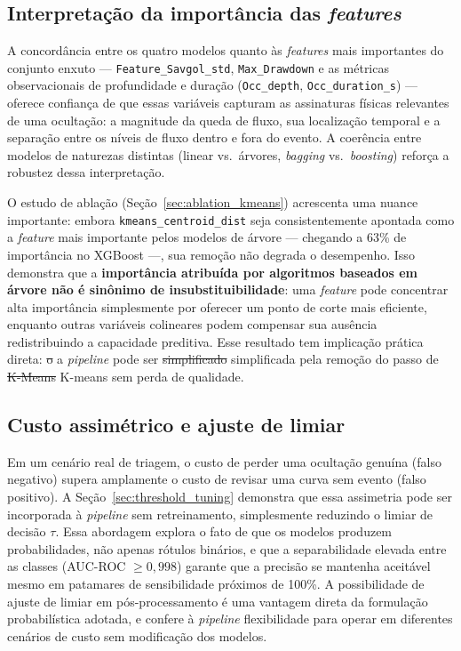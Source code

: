 \documentclass[msc]{on} %
\makeatletter
\providecommand{\DIFaddtex}[1]{{\protect\color{red}#1}} %
\providecommand{\DIFdeltex}[1]{{\protect\color{red}\sout{#1}}} %
\providecommand{\DIFaddbegin}{} %
\providecommand{\DIFaddend}{} %
\providecommand{\DIFdelbegin}{} %
\providecommand{\DIFdelend}{} %
\providecommand{\DIFadd}[1]{\texorpdfstring{\DIFaddtex{#1}}{#1}} %
\providecommand{\DIFdel}[1]{\texorpdfstring{\DIFdeltex{#1}}{}} %
\let\sout@orig\sout %
\renewcommand{\sout}[1]{\ifmmode\text{\sout@orig{\ensuremath{#1}}}\else\sout@orig{#1}\fi} %
\makeatother
\begin{document}
\subsection{Interpretação da importância das \textit{features}}

A concordância entre os quatro modelos quanto às \textit{features} mais importantes do conjunto enxuto --- \texttt{Feature\_Savgol\_std}, \texttt{Max\_Drawdown} e as métricas observacionais de profundidade e duração (\texttt{Occ\_depth}, \texttt{Occ\_duration\_s}) --- oferece confiança de que essas variáveis capturam as assinaturas físicas relevantes de uma ocultação: a magnitude da queda de fluxo, sua localização temporal e a separação entre os níveis de fluxo dentro e fora do evento. A coerência entre modelos de naturezas distintas (linear vs.\ árvores, \textit{bagging} vs.\ \textit{boosting}) reforça a robustez dessa interpretação.

O estudo de ablação (Seção~\ref{sec:ablation_kmeans}) acrescenta uma nuance importante: embora \texttt{kmeans\_centroid\_dist} seja consistentemente apontada como a \textit{feature} mais importante pelos modelos de árvore --- chegando a 63\% de importância no XGBoost ---, sua remoção não degrada o desempenho. Isso demonstra que a \textbf{importância atribuída por algoritmos baseados em árvore não é sinônimo de insubstituibilidade}: uma \textit{feature} pode concentrar alta importância simplesmente por oferecer um ponto de corte mais eficiente, enquanto outras variáveis colineares podem compensar sua ausência redistribuindo a capacidade preditiva. Esse resultado tem implicação prática direta: \DIFdelbegin \DIFdel{o }\DIFdelend \DIFaddbegin \DIFadd{a }\DIFaddend \textit{pipeline} pode ser \DIFdelbegin \DIFdel{simplificado }\DIFdelend \DIFaddbegin \DIFadd{simplificada }\DIFaddend pela remoção do passo de \DIFdelbegin \DIFdel{K-Means }\DIFdelend \DIFaddbegin \DIFadd{K-means }\DIFaddend sem perda de qualidade.

\subsection{Custo assimétrico e ajuste de limiar}

Em um cenário real de triagem, o custo de perder uma ocultação genuína (falso negativo) supera amplamente o custo de revisar uma curva sem evento (falso positivo). A Seção~\ref{sec:threshold_tuning} demonstra que essa assimetria pode ser incorporada à \textit{pipeline} sem retreinamento, simplesmente reduzindo o limiar de decisão $\tau$. Essa abordagem explora o fato de que os modelos produzem probabilidades, não apenas rótulos binários, e que a separabilidade elevada entre as classes (AUC-ROC $\geq 0{,}998$) garante que a precisão se mantenha aceitável mesmo em patamares de sensibilidade próximos de 100\%. A possibilidade de ajuste de limiar em pós-processamento é uma vantagem direta da formulação probabilística adotada, e confere à \textit{pipeline} flexibilidade para operar em diferentes cenários de custo sem modificação dos modelos.
\end{document}
